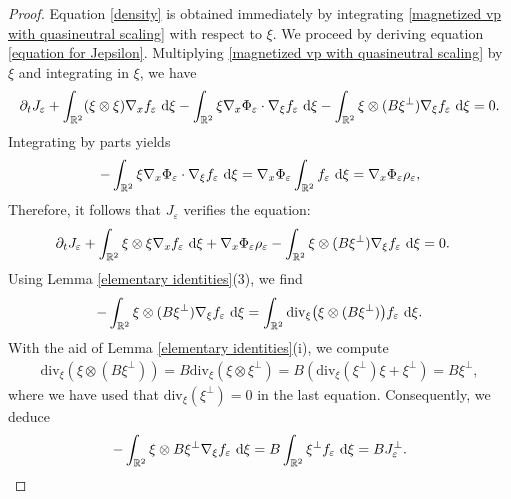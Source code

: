 \documentclass[11pt,reqno]{amsart}
\numberwithin{equation}{section}
\def\dd{{\rm d}}
\begin{document}
\begin{proof}
Equation \eqref{density} is obtained immediately by integrating \eqref{magnetized vp with quasineutral scaling} with respect to $\xi$. 
We proceed by deriving equation \eqref{equation for Jepsilon}. Multiplying \eqref{magnetized vp with quasineutral scaling} by $\xi$ and integrating in $\xi$, we have 
\begin{align*}
\partial_{t}J_{\varepsilon} +\int_{\mathbb{R}^{2}} (\xi\otimes \xi) \nabla _{x}f_{\varepsilon}\ \dd \xi-\int_{\mathbb{R}^{2}} \xi \nabla_{x}\Phi_{\varepsilon}\cdot \nabla_{\xi} f_{\varepsilon} \ \dd \xi-\int_{\mathbb{R}^{2}}\xi \otimes (B\xi^{\perp})\nabla_{\xi}f_{\varepsilon} \ \dd \xi=0. 
\end{align*}
Integrating by parts yields
\begin{align}
-\int_{\mathbb{R}^{2}}\xi \nabla_{x}\Phi_{\varepsilon}\cdot \nabla_{\xi}f_{\varepsilon}\ \dd \xi=\nabla_{x}\Phi_{\varepsilon}\int_{\mathbb{R}^{2}} f_{\varepsilon}\ \dd \xi=\nabla_{x}\Phi_{\varepsilon}\rho_{\varepsilon},  \label{third term}   
\end{align}
Therefore, it follows that $J_{\varepsilon}$ verifies the equation:  
\begin{align}
&\partial_{t}J_{\varepsilon}+\int_{\mathbb{R}^{2}}\xi\otimes \xi\nabla_{x}f_{\varepsilon}\ \dd \xi \notag+\nabla_{x}\Phi_{\varepsilon}\rho_{\varepsilon}-\int_{\mathbb{R}^{2}}\xi\otimes (B\xi ^{\perp})\nabla_{\xi}f_{\varepsilon}\ \dd \xi=0. \label{first eq for J}     
\end{align}
Using Lemma \ref{elementary identities}(3), we find 
\begin{align}
-\int_{\mathbb{R}^{2}}\xi\otimes (B\xi^{\perp})\nabla_{\xi}f_{\varepsilon} \ \dd \xi=\int_{\mathbb{R}^{2}}\mathrm{div}_{\xi}\big(\xi\otimes (B\xi^{\perp})\big)
f_{\varepsilon}\ \dd \xi.   
\end{align}
With the aid of Lemma \ref{elementary identities}(i), we compute 
\begin{align*}
\mathrm{div}_{\xi}(\xi\otimes (B\xi^{\perp}))=B\mathrm{div}_{\xi}(\xi\otimes \xi^{\perp})=B(\mathrm{div}_{\xi}(\xi^{\perp})\xi+\xi^{\perp})=B\xi^{\perp},   
\end{align*}
where we have used that $\mathrm{div}_{\xi}(\xi^{\perp})=0$ in the last equation. 
Consequently, we deduce 
\begin{align*}
-\int_{\mathbb{R}^{2}} \xi\otimes B\xi^{\perp}\nabla_{\xi}f_{\varepsilon}\ \dd \xi=B\int_{\mathbb{R}^{2}} \xi^{\perp} f_{\varepsilon}\ \dd \xi=BJ_{\varepsilon}^{\perp}.  
\end{align*}

\end{proof}
\end{document}
